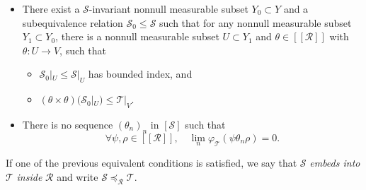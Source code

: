 \documentclass[11pt]{amsart}
\numberwithin{equation}{section}
\theoremstyle{plain}
\theoremstyle{definition}
\begin{document}
\begin{itemize}
\item [$(\rm i)$] There exist a $\mathscr S$-invariant nonnull measurable subset $Y_0 \subset Y$ and a subequivalence relation $\mathscr S_0 \leq \mathscr S$ such that for any nonnull measurable subset $Y_1 \subset Y_0$, there is a nonnull measurable subset $U \subset Y_1$ and $\theta \in [[\mathscr R]]$ with $\theta : U \to V$, such that 
\begin{itemize}
\item $\mathscr S_0|_U \leq \mathscr S|_U$ has bounded index, and

\item  $(\theta \times \theta)(\mathscr S_0|_U) \leq \mathscr T|_V$.
\end{itemize}

\item [$(\rm ii)$] There is no sequence $(\theta_n)_n$ in $[\mathscr S]$ such that
$$\forall \psi, \rho \in [[\mathscr R]], \quad \lim_n \varphi_{\mathscr T}(\psi \theta_n \rho) = 0.$$
\end{itemize}
If one of the previous equivalent conditions is satisfied, we say that $\mathscr S$ {\it embeds into} $\mathscr T$ {\it inside} $\mathscr R$ and write $\mathscr S \preceq_{\mathscr R} \mathscr T$. 
\end{document}
